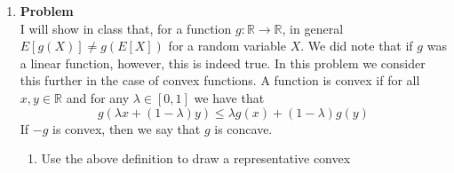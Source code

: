 \documentclass[12pt]{article}
\newenvironment{Ex}{\textbf{Problem}\vspace{.75em}\\}{}
\begin{document}
\begin{enumerate}
\begin{Ex}
\begin{solution}
\begin{enumerate}
          \begin{equation}
            \label{eq:6d-sol-reg}
            \begin{aligned}
              \frac{p_X(1)}{p_X(x)} &=
              \frac{\frac{k}{1^{\alpha}}}{\frac{k}{x^{\alpha}}} \\
              &= \frac{k}{1^{\alpha}} \frac{x^{\alpha}}{k} \\
              &= x^{\alpha}
            \end{aligned}
          \end{equation}
          If the profile was given by a geometric distribution, then
          the most popular item will be chosen with probability
          $p_X(1) = p$ and the $x$th most popular item will be chosen
          with probability $p_X(x) = (1-p)^{x-1}(p)$. We would like to
          find $\frac{p_X(1)}{p_X(x)}$, which is given by
          \begin{equation}
            \label{eq:6d-sol-geo}
            \begin{aligned}
              \frac{p_X(1)}{p_X(x)} &= \frac{p}{(1-p)^{x-1}(p)} \\
              &= \frac{1}{(1-p)^{x-1}} \\
              &= (1-p)^{1-x} \\
            \end{aligned}
          \end{equation}
        \end{enumerate}
      \end{solution}
    \end{Ex}
  \item
    \begin{Ex}
      I will show in class that, for a function $g : \mathbb{R}
      \rightarrow \mathbb{R}$, in general $E[g(X)] \not= g(E[X])$ for
      a random variable $X$. We did note that if $g$ was a linear
      function, however, this is indeed true. In this problem we
      consider this further in the case of convex functions. A
      function is convex if for all $x, y \in \mathbb{R}$ and for any
      $\lambda \in [0, 1]$ we have that
      \begin{equation}
        \label{eq:convex-prob}
        g(\lambda x + (1-\lambda)y) \le \lambda g(x) + (1-\lambda)g(y)
      \end{equation}
      If $-g$ is convex, then we say that $g$ is concave.
      \begin{enumerate}
      \item Use the above definition to draw a representative convex

\end{enumerate}
\end{Ex}
\end{enumerate}
\end{document}
